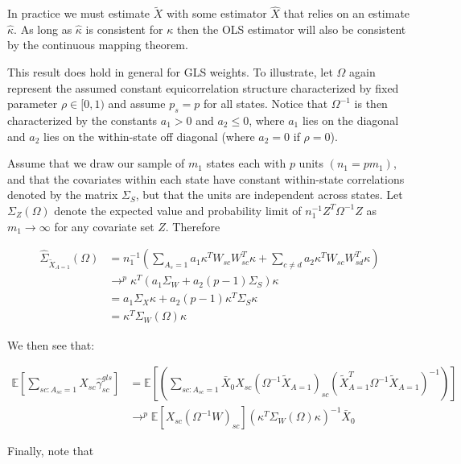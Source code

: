 \begin{remark}
    In practice we must estimate $\tilde{X}$ with some estimator $\hat{X}$ that relies on an estimate $\hat{\kappa}$. As long as $\hat{\kappa}$ is consistent for $\kappa$ then the OLS estimator will also be consistent by the continuous mapping theorem.
\end{remark}

\begin{remark}
    This result does hold in general for GLS weights. To illustrate, let $\Omega$ again represent the assumed constant equicorrelation structure characterized by fixed parameter $\rho \in [0, 1)$ and assume $p_s = p$ for all states. Notice that $\Omega^{-1}$ is then characterized by the constants $a_1 > 0$ and $a_2 \le 0$, where $a_1$ lies on the diagonal and $a_2$ lies on the within-state off diagonal (where $a_2 = 0$ if $\rho = 0$).
    
    Assume that we draw our sample of $m_1$ states each with $p$ units $(n_1 = pm_1)$, and that the covariates within each state have constant within-state correlations denoted by the matrix $\Sigma_S$, but that the units are independent across states. Let $\Sigma_Z(\Omega)$ denote the expected value and probability limit of $n_1^{-1}Z^T\Omega^{-1}Z$ as $m_1 \to \infty$ for any covariate set $Z$. Therefore
    
    \begin{align*}
    \hat{\Sigma}_{\tilde{X}_{A=1}}(\Omega) &= n_1^{-1}(\sum_{A_s=1} a_1\kappa^TW_{sc}W_{sc}^T\kappa + \sum_{c\ne d}a_2\kappa^TW_{sc}W_{sd}^T\kappa) \\
    &\to^p \kappa^T(a_1\Sigma_W + a_2(p-1)\Sigma_S)\kappa \\
    &= a_1\Sigma_X\kappa + a_2(p-1)\kappa^T\Sigma_S\kappa \\
    &= \kappa^T\Sigma_W(\Omega)\kappa
    \end{align*}

    We then see that:
    
    \begin{align*}
        \mathbb{E}[\sum_{sc: A_{sc} = 1}X_{sc}\hat{\gamma}^{gls}_{sc}] &= \mathbb{E}[(\sum_{sc: A_{sc} = 1}\bar{X}_0 X_{sc}(\Omega^{-1}\tilde{X}_{A=1})_{sc}(\tilde{X}^T_{A=1}\Omega^{-1}\tilde{X}_{A=1})^{-1})] \\
        &\to^p \mathbb{E}[X_{sc}(\Omega^{-1}W)_{sc}](\kappa^T\Sigma_W(\Omega)\kappa)^{-1}\bar{X}_0
    \end{align*}
    
    Finally, note that
    

\end{remark}
